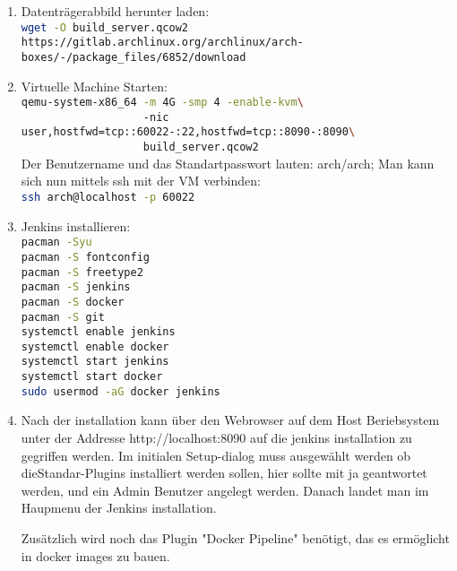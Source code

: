 \begin{enumerate}
    \item Datenträgerabbild herunter laden:\\
        \lstinline[language=sh]!wget -O build_server.qcow2 https://gitlab.archlinux.org/archlinux/arch-boxes/-/package_files/6852/download!
    \item Virtuelle Machine Starten:\\
    \lstinline[language=sh]!qemu-system-x86_64 -m 4G -smp 4 -enable-kvm\! \\
    \lstinline[language=sh]!                   -nic user,hostfwd=tcp::60022-:22,hostfwd=tcp::8090-:8090\ !\\
    \lstinline[language=sh]!                   build_server.qcow2!\\
    Der Benutzername und das Standartpasswort lauten: arch/arch; Man kann sich nun mittels ssh mit der \ac{VM} verbinden:\\
    \lstinline[language=sh]!ssh arch@localhost -p 60022!\\
    \item Jenkins installieren:\\
    \lstinline[language=sh]!pacman -Syu !\\
    \lstinline[language=sh]!pacman -S fontconfig!\\
    \lstinline[language=sh]!pacman -S freetype2!\\
    \lstinline[language=sh]!pacman -S jenkins!\\
    \lstinline[language=sh]!pacman -S docker!\\
    \lstinline[language=sh]!pacman -S git!\\
    \lstinline[language=sh]!systemctl enable jenkins!\\
    \lstinline[language=sh]!systemctl enable docker!\\
    \lstinline[language=sh]!systemctl start jenkins!\\
    \lstinline[language=sh]!systemctl start docker!\\
    \lstinline[language=sh]!sudo usermod -aG docker jenkins!\\
    \item Nach der installation kann über den Webrowser auf dem Host Beriebsystem unter der Addresse http://localhost:8090 auf die jenkins installation zu gegriffen werden. Im initialen Setup-dialog muss ausgewählt werden ob dieStandar-Plugins installiert werden sollen, hier sollte mit ja geantwortet werden, und ein Admin Benutzer angelegt werden. Danach landet man im Haupmenu der Jenkins installation.

Zusätzlich wird noch das Plugin "Docker Pipeline" benötigt, das es ermöglicht in docker images zu bauen.
\end{enumerate}

